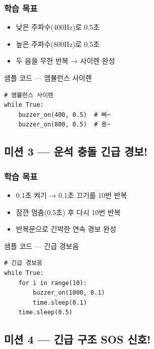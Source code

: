\subsubsection*{학습 목표}
\begin{itemize}[leftmargin=1.4em]
  \item 낮은 주파수(400Hz)로 0.5초
  \item 높은 주파수(800Hz)로 0.5초
  \item 두 음을 무한 반복 → 사이렌 완성
\end{itemize}

\begin{labbox}{샘플 코드 --- 앰뷸런스 사이렌}
\begin{verbatim}
# 앰뷸런스 사이렌
while True:
    buzzer_on(400, 0.5)  # 삐─
    buzzer_on(800, 0.5)  # 용─
\end{verbatim}
\end{labbox}

\subsection{미션 3 --- 운석 충돌 긴급 경보!}
\label{subsec:ch04-m3}

\begin{storybox}
\end{storybox}

\subsubsection*{학습 목표}
\begin{itemize}[leftmargin=1.4em]
  \item 0.1초 켜기 → 0.1초 끄기를 10번 반복
  \item 잠깐 멈춤(0.5초) 후 다시 10번 반복
  \item 반복문으로 긴박한 연속 경보 완성
\end{itemize}

\begin{labbox}{샘플 코드 --- 긴급 경보음}
\begin{verbatim}
# 긴급 경보음
while True:
    for i in range(10):
        buzzer_on(1000, 0.1)
        time.sleep(0.1)
    time.sleep(0.5)
\end{verbatim}
\end{labbox}

\subsection{미션 4 --- 긴급 구조 SOS 신호!}
\label{subsec:ch04-m4}

